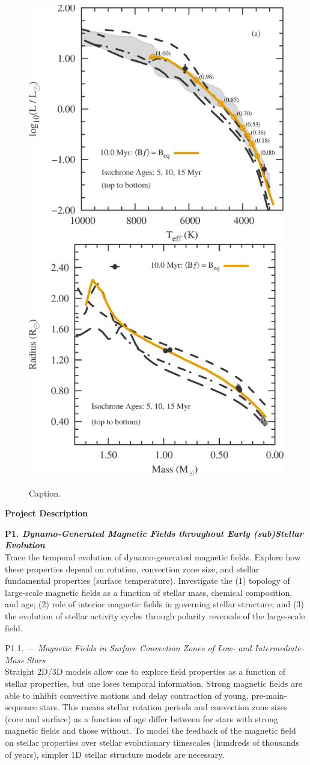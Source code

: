 \documentclass[12pt,a4paper]{article}
\begin{document}
\begin{figure}
	\centering
	\includegraphics[width=0.45\linewidth]{./fig/USco_HR_diagram.eps} \qquad
	\includegraphics[width=0.45\linewidth]{./fig/USco_MR_diagram.eps}
	\caption{Caption.}
	\label{fig:usco}
\end{figure}

{\bf \large Project Description}

\textbf{P1. \emph{Dynamo-Generated Magnetic Fields throughout Early (sub)Stellar Evolution}} \\
Trace the temporal evolution of dynamo-generated magnetic fields. Explore how these properties depend on rotation, convection zone size, and stellar fundamental properties (surface temperature). Investigate the (1) topology of large-scale magnetic fields as a function of stellar mass, chemical composition, and age; (2) role of interior magnetic fields in governing stellar structure; and (3) the evolution of stellar activity cycles through polarity reversals of the large-scale field.

P1.1. --- \emph{Magnetic Fields in Surface Convection Zones of Low- and Intermediate-Mass Stars} \\
Straight 2D/3D models allow one to explore field properties as a function of stellar properties, but one loses temporal information. Strong magnetic fields are able to inhibit convective motions and delay contraction of young, pre-main-sequence stars. This means stellar rotation periods and convection zone sizes (core and surface) as a function of age differ between for stars with strong magnetic fields and those without. To model the feedback of the magnetic field on stellar properties over stellar evolutionary timescales (hundreds of thousands of years), simpler 1D stellar structure models are necessary. 
\end{document}
